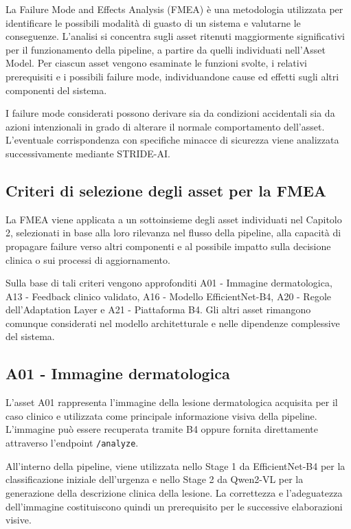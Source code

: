 La Failure Mode and Effects Analysis (FMEA) è una metodologia utilizzata per identificare le possibili modalità di guasto di un sistema e valutarne le conseguenze. L'analisi si concentra sugli asset ritenuti maggiormente significativi per il funzionamento della pipeline, a partire da quelli individuati nell'Asset Model. Per ciascun asset vengono esaminate le funzioni svolte, i relativi prerequisiti e i possibili failure mode, individuandone cause ed effetti sugli altri componenti del sistema.

I failure mode considerati possono derivare sia da condizioni accidentali sia da azioni intenzionali in grado di alterare il normale comportamento dell'asset. L'eventuale corrispondenza con specifiche minacce di sicurezza viene analizzata successivamente mediante STRIDE-AI.

\subsection*{Criteri di selezione degli asset per la FMEA}
La FMEA viene applicata a un sottoinsieme degli asset individuati nel Capitolo 2, selezionati in base alla loro rilevanza nel flusso della pipeline, alla capacità di propagare failure verso altri componenti e al possibile impatto sulla decisione clinica o sui processi di aggiornamento.

Sulla base di tali criteri vengono approfonditi A01 - Immagine dermatologica, A13 - Feedback clinico validato, A16 - Modello EfficientNet-B4, A20 - Regole dell'Adaptation Layer e A21 - Piattaforma B4. Gli altri asset rimangono comunque considerati nel modello architetturale e
nelle dipendenze complessive del sistema.


\subsection{A01 - Immagine dermatologica}
L'asset A01 rappresenta l'immagine della lesione dermatologica acquisita per il caso clinico e utilizzata come principale informazione visiva della pipeline. L'immagine può essere recuperata tramite B4 oppure fornita direttamente attraverso l'endpoint \texttt{/analyze}.

All'interno della pipeline, viene utilizzata nello Stage 1 da EfficientNet-B4 per la classificazione iniziale dell'urgenza e nello Stage 2 da Qwen2-VL per la generazione della descrizione clinica della lesione. La correttezza e l'adeguatezza dell'immagine costituiscono quindi un prerequisito per le successive elaborazioni visive.

